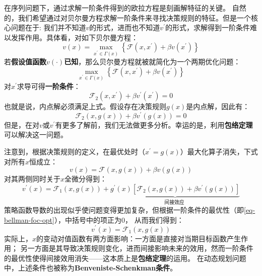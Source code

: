 在序列问题下，通过求解一阶条件得到的欧拉方程是刻画解特征的关键。
自然的，我们希望通过对贝尔曼方程求解一阶条件来寻找决策规则的特征。但是一个核心问题在于:
我们并不知道$v$的形式，进而也不知道$v^{\prime}$的形式，求解得到一阶条件难以发挥作用。具体看，对如下贝尔曼方程：
\begin{equation*}
    v(x)=\max _{x^{\prime} \in \Gamma(x)}
        \left\{\mathcal{F}\left(x, x^{\prime}\right)+\beta v\left(x^{\prime}\right)\right\}
\end{equation*}
若\textbf{假设值函数$v\left(\cdot\right)$已知}，那么贝尔曼方程就被就简化为一个两期优化问题：
\begin{equation*}
    \max _{x^{\prime} \in \Gamma(x)}
        \left\{\mathcal{F}\left(x, x^{\prime}\right)+\beta v\left(x^{\prime}\right)\right\}
\end{equation*}
对$x^{\prime}$求导可得\textbf{一阶条件}：
\begin{equation}   \label{eq-bellman-foc} 
    \mathcal{F}_2(x,x^{\prime}) + \beta v^{\prime}(x^{\prime}) = 0
\end{equation}
也就是说，内点解必须满足上式。假设存在决策规则$g(x)$是内点解，因此有：
\begin{equation}   \label{eq-bellman-foc-opt}
    \mathcal{F}_2\left(x, g(x)\right) + \beta v^{\prime}\left(g(x)\right)=0
\end{equation}
但是，在对$v$或$v^{\prime}$有更多了解前，我们无法做更多分析。幸运的是，利用\textbf{包络定理}可以解决这一问题。

注意到，根据决策规则的定义，在最优处时（$x^{\prime} = g(x)$）最大化算子消失，下式对所有$x$恒成立：
\begin{equation}    \label{eq-bellman-opt}
    v(x)=\mathcal{F}(x, g(x))+\beta v(g(x))
\end{equation}
对其两侧同时关于$x$全微分得到：
\begin{equation*}
    v^{\prime}(x) = \mathcal{F}_1(x, g(x))
        +\underbrace{g^{\prime}(x)\left[\mathcal{F}_2(x, g(x))
        +\beta v^{\prime}(g(x))\right]}_{\text {间接效应 } }
\end{equation*}
策略函数导数的出现似乎使问题变得更加复杂，但根据一阶条件的最优性（即\cref{eq-bellman-foc-opt}），中括号中的项正为0，
从而我们得到：
\begin{equation*}
    v^{\prime}(x) = \mathcal{F}_1\left(x,g(x)\right)
\end{equation*}
实际上，$x$的变动对值函数有两方面影响：一方面是直接对当期目标函数产生作用；
另一方面是其导致决策规则变化，进而间接影响未来的效用，然而一阶条件的最优性使得间接效用消失——这本质上是\textbf{包络定理}的运用。
在动态规划问题中，上述条件也被称为\textbf{Benveniste-Schenkman条件}。

